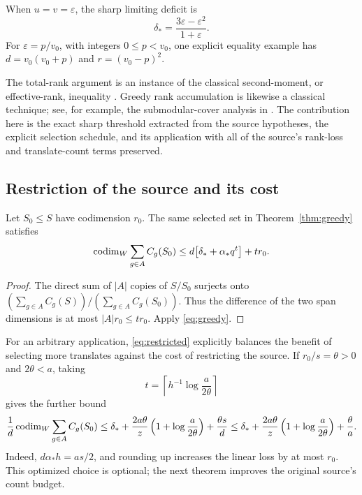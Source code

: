 \begin{corollary}
When \(u=v=\varepsilon\), the sharp limiting deficit is
\[
 \delta_*=\frac{3\varepsilon-\varepsilon^2}{1+\varepsilon}.
\]
For \(\varepsilon=p/v_0\), with integers \(0\le p<v_0\),
one explicit equality example has
\(d=v_0(v_0+p)\) and \(r=(v_0-p)^2\).
\end{corollary}

The total-rank argument is an instance of the classical
second-moment, or effective-rank, inequality \cite{welch,mixon}.
Greedy rank accumulation is likewise a classical technique; see, for example,
the submodular-cover analysis in \cite{wolsey}. The contribution here
is the exact sharp threshold extracted from the source hypotheses,
the explicit selection schedule, and its application with all of
the source's rank-loss and translate-count terms preserved.

\subsection{Restriction of the source and its cost}

\begin{lemma}\label{lem:restriction}
Let \(S_0\le S\) have codimension \(r_0\). The same selected
set in Theorem~\ref{thm:greedy} satisfies
\begin{equation}\label{eq:restricted}
 \operatorname{codim}_W\sum_{g\in A}C_g(S_0)
 \le d\bigl[\delta_*+\alpha_*q^t\bigr]+t r_0.
\end{equation}
\end{lemma}

\begin{proof}
The direct sum of \(|A|\) copies of \(S/S_0\) surjects onto
\((\sum_{g\in A}C_g(S))/(\sum_{g\in A}C_g(S_0))\).
Thus the difference of the two span dimensions is at most
\(|A|r_0\le t r_0\). Apply \eqref{eq:greedy}.
\end{proof}

For an arbitrary application, \eqref{eq:restricted} explicitly
balances the benefit of selecting more translates against the
cost of restricting the source. If \(r_0/s=\theta>0\) and
\(2\theta<a\), taking
\[
 t=\left\lceil h^{-1}\log\frac{a}{2\theta}\right\rceil
\]
gives the further bound
\[
 \frac1d\operatorname{codim}_W\sum_{g\in A}C_g(S_0)
 \le\delta_*+
 \frac{2a\theta}{z}\left(1+\log\frac{a}{2\theta}\right)
 +\frac{\theta s}{d}
 \le\delta_*+
 \frac{2a\theta}{z}\left(1+\log\frac{a}{2\theta}\right)
 +\frac{\theta}{a}.
\]
Indeed, \(d\alpha_*h=as/2\), and rounding up increases the
linear loss by at most \(r_0\). This optimized choice is optional;
the next theorem improves the original source's count budget.


